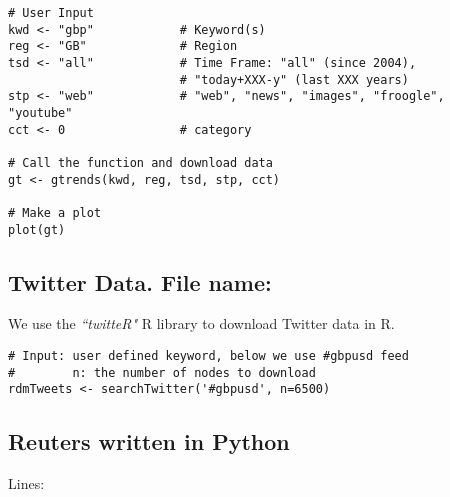 \documentclass[12pt]{article}
\begin{document}
\begin{lstlisting}[title=\textbf{Google Trends Download}]
# User Input
kwd <- "gbp"         	# Keyword(s)
reg <- "GB"             # Region
tsd <- "all"            # Time Frame: "all" (since 2004),
                        # "today+XXX-y" (last XXX years)
stp <- "web"            # "web", "news", "images", "froogle", "youtube"
cct <- 0                # category

# Call the function and download data
gt <- gtrends(kwd, reg, tsd, stp, cct)

# Make a plot
plot(gt)
\end{lstlisting}

\subsection{Twitter Data. File name: \color{blue}{Twitter.R}}

We use the \emph{``twitteR"} R library to download Twitter data in R.

\begin{lstlisting}[title=\textbf{Twitter Data}]
# Input: user defined keyword, below we use #gbpusd feed
#        n: the number of nodes to download
rdmTweets <- searchTwitter('#gbpusd', n=6500)
\end{lstlisting}

\subsection{Reuters written in Python}

Lines:
\end{document}
